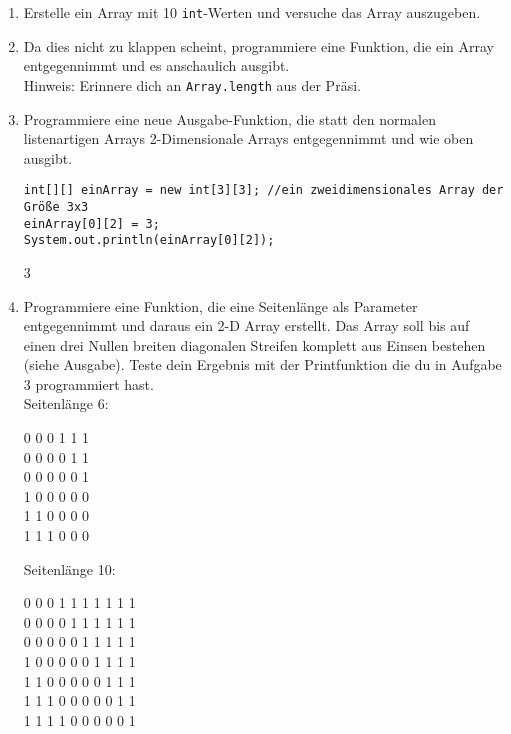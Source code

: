 \documentclass{../../sheet}
\begin{document}
\begin{enumerate}
    \item Erstelle ein Array mit 10 \texttt{int}-Werten und versuche das Array auszugeben.
    \item Da dies nicht zu klappen scheint, programmiere eine Funktion, die ein Array entgegennimmt und es anschaulich ausgibt.\\
          Hinweis: Erinnere dich an \texttt{Array.length} aus der Präsi.
    \item Programmiere eine neue Ausgabe-Funktion, die statt den normalen listenartigen Arrays 2-Dimensionale Arrays entgegennimmt und wie oben ausgibt.\\
    \begin{verbatim}
int[][] einArray = new int[3][3]; //ein zweidimensionales Array der Größe 3x3
einArray[0][2] = 3;
System.out.println(einArray[0][2]);
    \end{verbatim}
    \begin{ausgabe}
        3
    \end{ausgabe}
    \item Programmiere eine Funktion, die eine Seitenlänge als Parameter entgegennimmt und daraus ein 2-D Array erstellt. Das Array soll bis auf einen drei Nullen breiten diagonalen Streifen komplett aus Einsen bestehen (siehe Ausgabe). Teste dein Ergebnis mit der Printfunktion die du in Aufgabe 3 programmiert hast.\\
          Seitenlänge 6:
          \begin{ausgabe}
              0 0 0 1 1 1\\
              0 0 0 0 1 1\\
              0 0 0 0 0 1\\
              1 0 0 0 0 0\\
              1 1 0 0 0 0\\
              1 1 1 0 0 0
          \end{ausgabe}
          Seitenlänge 10:
          \begin{ausgabe}
              0 0 0 1 1 1 1 1 1 1 \\
              0 0 0 0 1 1 1 1 1 1 \\
              0 0 0 0 0 1 1 1 1 1 \\
              1 0 0 0 0 0 1 1 1 1 \\
              1 1 0 0 0 0 0 1 1 1 \\
              1 1 1 0 0 0 0 0 1 1 \\
              1 1 1 1 0 0 0 0 0 1 \\

\end{ausgabe}
\end{enumerate}
\end{document}
